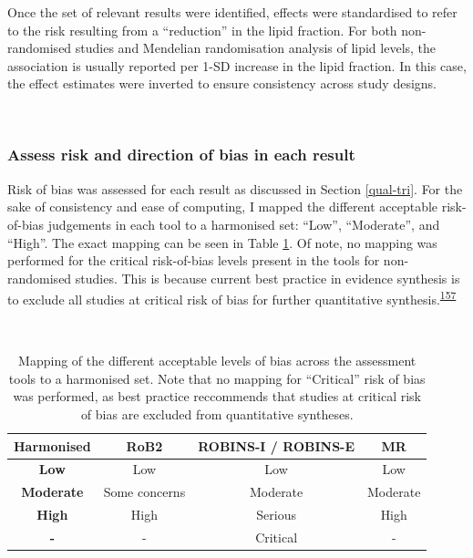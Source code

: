 \documentclass[a4paper, twoside]{templates/ociamthesis}
\begin{document}
Once the set of relevant results were identified, effects were standardised to refer to the risk resulting from a ``reduction'' in the lipid fraction. For both non-randomised studies and Mendelian randomisation analysis of lipid levels, the association is usually reported per 1-SD increase in the lipid fraction. In this case, the effect estimates were inverted to ensure consistency across study designs.

~

\hypertarget{assess-risk-and-direction-of-bias-in-each-result}{%
\subsubsection{Assess risk and direction of bias in each result}\label{assess-risk-and-direction-of-bias-in-each-result}}

Risk of bias was assessed for each result as discussed in Section \ref{qual-tri}. For the sake of consistency and ease of computing, I mapped the different acceptable risk-of-bias judgements in each tool to a harmonised set: ``Low'', ``Moderate'', and ``High''. The exact mapping can be seen in Table \ref{tab:robLevelsMapping-table}. Of note, no mapping was performed for the critical risk-of-bias levels present in the tools for non-randomised studies. This is because current best practice in evidence synthesis is to exclude all studies at critical risk of bias for further quantitative synthesis.\textsuperscript{\protect\hyperlink{ref-sterne2016}{157}}

~\\




\begin{table}[H]

\caption[Mapping of risk-of-bias judgements across assessment tools]{\label{tab:robLevelsMapping-table}Mapping of the different acceptable levels of bias across the assessment tools to a harmonised set. Note that no mapping for ``Critical'' risk of bias was performed, as best practice reccommends that studies at critical risk of bias are excluded from quantitative syntheses.}
\centering
\begin{tabular}[t]{>{}cccc}
\toprule
\textbf{Harmonised} & \textbf{RoB2} & \textbf{ROBINS-I / ROBINS-E} & \textbf{MR}\\
\midrule
\textbf{Low} & Low & Low & Low\\
\midrule
\textbf{Moderate} & Some concerns & Moderate & Moderate\\
\midrule
\textbf{High} & High & Serious & High\\
\midrule
\textbf{-} & - & Critical & -\\
\bottomrule
\end{tabular}
\end{table}
\end{document}
